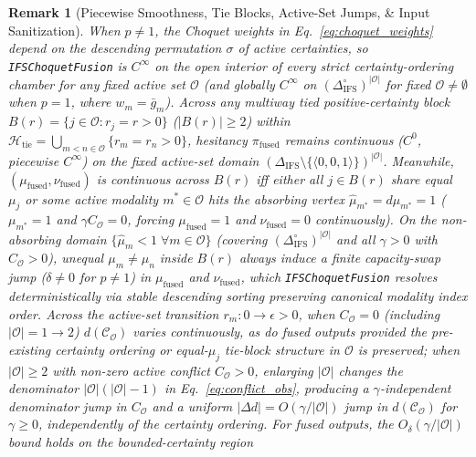 \documentclass[10pt,twocolumn]{article}
\newtheorem{remark}{Remark}
\begin{document}
\begin{remark}[Piecewise Smoothness, Tie Blocks, Active-Set Jumps, \& Input Sanitization]
\label{rem:float64_choquet}
When $p \neq 1$, the Choquet weights in Eq.~\eqref{eq:choquet_weights} depend on the descending
permutation $\sigma$ of active certainties, so \texttt{IFSChoquetFusion} is $C^\infty$ on the
open interior of every strict certainty-ordering chamber for any fixed active set $\mathcal{O}$
(and globally $C^\infty$ on $(\Delta_{\text{IFS}}^\circ)^{|\mathcal{O}|}$ for fixed
$\mathcal{O} \neq \emptyset$ when $p = 1$, where $w_m = \bar{g}_m$). Across any multiway tied
positive-certainty block $B(r)=\{j\in\mathcal{O}: r_j=r>0\}$ ($|B(r)| \ge 2$) within
$\mathcal{H}_{\text{tie}} = \bigcup_{m<n\in\mathcal{O}} \{r_m = r_n > 0\}$, hesitancy
$\pi_{\text{fused}}$ remains continuous ($C^0$, piecewise $C^\infty$) on the fixed active-set
domain $(\Delta_{\text{IFS}} \setminus \{\langle 0,0,1\rangle\})^{|\mathcal{O}|}$. Meanwhile,
$(\mu_{\text{fused}}, \nu_{\text{fused}})$ is continuous across $B(r)$ iff either all $j\in
B(r)$ share equal $\mu_j$ or some active modality $m^*\in\mathcal{O}$ hits the absorbing vertex
$\hat{\mu}_{m^*} = d\mu_{m^*} = 1$ ($\mu_{m^*}=1$ and $\gamma C_{\mathcal{O}}=0$, forcing
$\mu_{\text{fused}}=1$ and $\nu_{\text{fused}}=0$ continuously). On the non-absorbing domain
$\{\hat{\mu}_m < 1\;\forall m\in\mathcal{O}\}$ (covering
$(\Delta_{\text{IFS}}^\circ)^{|\mathcal{O}|}$ and all $\gamma > 0$ with $C_{\mathcal{O}} > 0$),
unequal $\mu_m \neq \mu_n$ inside $B(r)$ always induce a finite capacity-swap jump ($\delta
\neq 0$ for $p \neq 1$) in $\mu_{\text{fused}}$ and $\nu_{\text{fused}}$, which
\texttt{IFSChoquetFusion} resolves deterministically via stable descending sorting preserving
canonical modality index order. Across the active-set transition $r_m : 0 \to \epsilon > 0$,
when $C_{\mathcal{O}} = 0$ (including $|\mathcal{O}| = 1 \to 2$) $d(\mathcal{C}_{\mathcal{O}})$
varies continuously, as do fused outputs provided the
pre-existing certainty ordering or equal-$\mu_j$ tie-block structure in $\mathcal{O}$ is
preserved; when $|\mathcal{O}| \ge 2$
with non-zero active conflict $C_{\mathcal{O}} > 0$, enlarging $|\mathcal{O}|$ changes the
denominator $|\mathcal{O}|(|\mathcal{O}|-1)$ in Eq.~\eqref{eq:conflict_obs}, producing a
$\gamma$-independent denominator jump in $C_{\mathcal{O}}$ and a uniform
$|\Delta d|=O(\gamma/|\mathcal{O}|)$ jump in $d(\mathcal{C}_{\mathcal{O}})$ for
$\gamma\ge0$, independently of the certainty ordering. For fused outputs, the
$O_\delta(\gamma/|\mathcal{O}|)$ bound holds on the bounded-certainty region

\end{remark}
\end{document}
